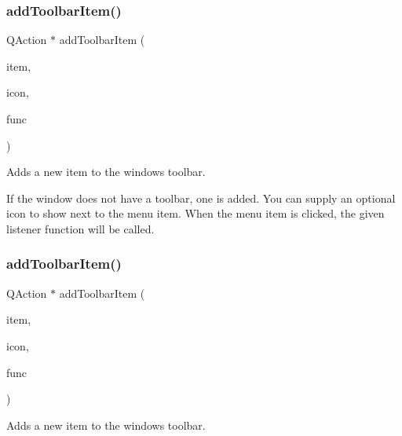 \subsubsection{\texorpdfstring{add\+Toolbar\+Item()}{addToolbarItem()}\hspace{0.1cm}{\footnotesize\ttfamily [2/4]}}
{\footnotesize\ttfamily Q\+Action $\ast$ add\+Toolbar\+Item (\begin{DoxyParamCaption}\item[{const std\+::string \&}]{item,  }\item[{const std\+::string \&}]{icon,  }\item[{\mbox{\hyperlink{namespacesgl_a54427ce97bb1c2804e4fe2b0a62e8b17}{G\+Event\+Listener\+Void}}}]{func }\end{DoxyParamCaption})\hspace{0.3cm}{\ttfamily [virtual]}}



Adds a new item to the window\textquotesingle{}s toolbar. 

If the window does not have a toolbar, one is added. You can supply an optional icon to show next to the menu item. When the menu item is clicked, the given listener function will be called. \mbox{\label{classsgl_1_1GWindow_a1cd26d8c9004f7cbd81cecfbd323f418}} 
\subsubsection{\texorpdfstring{add\+Toolbar\+Item()}{addToolbarItem()}\hspace{0.1cm}{\footnotesize\ttfamily [3/4]}}
{\footnotesize\ttfamily Q\+Action $\ast$ add\+Toolbar\+Item (\begin{DoxyParamCaption}\item[{const std\+::string \&}]{item,  }\item[{const Q\+Icon \&}]{icon,  }\item[{\mbox{\hyperlink{namespacesgl_a54427ce97bb1c2804e4fe2b0a62e8b17}{G\+Event\+Listener\+Void}}}]{func }\end{DoxyParamCaption})\hspace{0.3cm}{\ttfamily [virtual]}}



Adds a new item to the window\textquotesingle{}s toolbar. 


